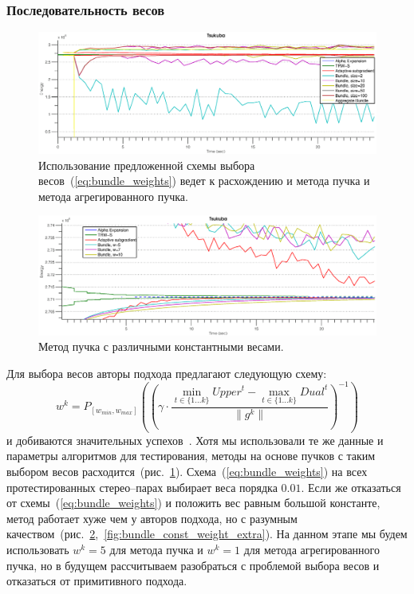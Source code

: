 \documentclass{article}
\begin{document}
\subsubsection{Последовательность весов}
\begin{figure}[t]
  \includegraphics[width=1.1\textwidth]{bundle_weights_problem_tsukuba.eps}
  \caption{Использование предложенной схемы выбора весов~(\ref{eq:bundle_weights}) ведет к расхождению и метода пучка и метода агрегированного пучка.}
  \label{fig:bundle_weights_problem}
\end{figure}

\begin{figure}[t]
  \includegraphics[width=1.1\textwidth]{bundle_const_weight_tsukuba.eps}
  \caption{Метод пучка с различными константными весами.}
  \label{fig:bundle_const_weight}
\end{figure}

Для выбора весов авторы подхода предлагают следующую схему:\\
\begin{equation}
   w^k = P_{[w_{min}, w_{max}]} \left ( \left (\gamma \cdot \frac{\min_{t \in \{1 \dots k\}}Upper^t - \max_{t \in \{1 \dots k\}} Dual^t}{\left \| g^k \right \|} \right )^{-1}\right )
   \label{eq:bundle_weights}
\end{equation}
и добиваются значительных успехов~\cite{Bundle}. Хотя мы использовали те же данные и параметры алгоритмов для тестирования, методы на основе пучков с таким выбором весов расходится~(рис.~\ref{fig:bundle_weights_problem}). Схема~(\ref{eq:bundle_weights}) на всех протестированных стерео--парах выбирает веса порядка $0.01$. Если же отказаться от схемы~(\ref{eq:bundle_weights}) и положить вес равным большой константе, метод работает хуже чем у авторов подхода, но с разумным качеством~(рис.~\ref{fig:bundle_const_weight},~\ref{fig:bundle_const_weight_extra}). На данном этапе мы будем использовать $w^k = 5$ для метода пучка и $w^k = 1$ для метода агрегированного пучка, но в будущем рассчитываем разобраться с проблемой выбора весов и отказаться от примитивного подхода.
\end{document}
